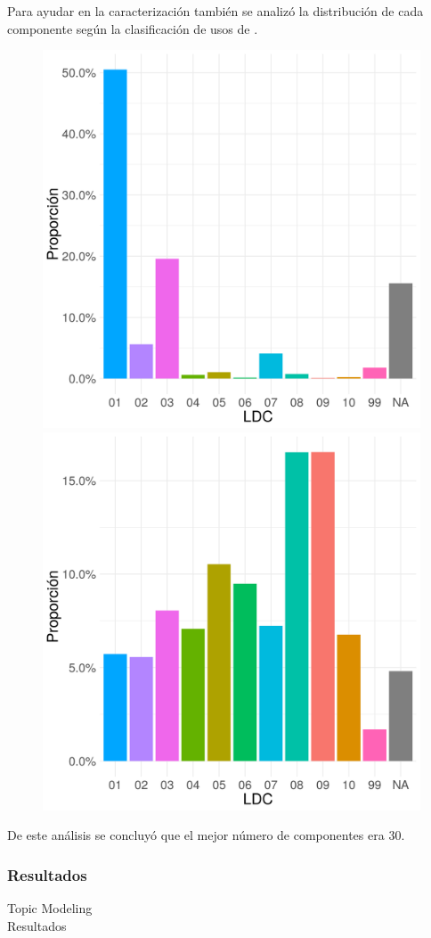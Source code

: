 \documentclass[compress]{beamer}
\begin{document}
\begin{frame}

Para ayudar en la caracterización también se analizó la distribución de cada componente según la clasificación de usos de \cite{lall2000technological}.
\begin{figure}
	\centering
	\includegraphics[width=0.45\linewidth]{graficoLall_k2_comp1}
	\includegraphics[width=0.45\linewidth]{graficoLall_k2_comp2}	
\end{figure}

De este análisis se concluyó que el mejor número de componentes era 30.

\end{frame}

\subsubsection{Resultados}

\begin{frame}
\centering
\Large Topic Modeling \\

\normalsize Resultados
\end{frame}
\end{document}
